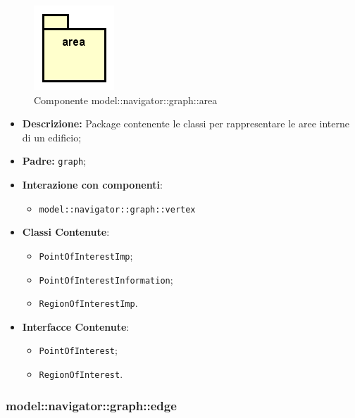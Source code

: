 \documentclass[../DefinizioneDiProdotto.tex]{subfiles}
\begin{document}
    \begin{figure}[H]
        \centering
        \includegraphics{img/package/area.png}
        \caption{Componente model::\-navigator::\-graph::\-area}\label{fig:model::navigator::graph::area} 
    \end{figure}
    \begin{itemize}
\item \textbf{Descrizione:} Package contenente le classi per rappresentare le aree interne di un edificio;
\item \textbf{Padre:} \texttt{graph};
\item \textbf{Interazione con componenti}:
\begin{itemize}
\item \texttt{model::navigator::graph::vertex}
\end{itemize}
\item \textbf{Classi Contenute}:
\begin{itemize}
\item \texttt{PointOfInterestImp};

\item \texttt{PointOfInterestInformation};

\item \texttt{RegionOfInterestImp}.

\end{itemize}
\item \textbf{Interfacce Contenute}:
\begin{itemize}
\item \texttt{PointOfInterest};

\item \texttt{RegionOfInterest}.

\end{itemize}
\end{itemize}

\subsubsection{model::\-navigator::\-graph::\-edge}
\end{document}
